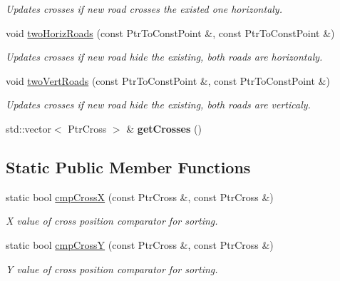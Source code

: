 \begin{DoxyCompactItemize}
\begin{DoxyCompactList}\small\item\em Updates crosses if new road crosses the existed one horizontaly. \end{DoxyCompactList}\item 
void \hyperlink{classCrossFactory_aabc61b3a89fc71f7758780135c599e97}{two\-Horiz\-Roads} (const Ptr\-To\-Const\-Point \&, const Ptr\-To\-Const\-Point \&)
\begin{DoxyCompactList}\small\item\em Updates crosses if new road hide the existing, both roads are horizontaly. \end{DoxyCompactList}\item 
void \hyperlink{classCrossFactory_ac699978962ee263fb01c189891cb4a9b}{two\-Vert\-Roads} (const Ptr\-To\-Const\-Point \&, const Ptr\-To\-Const\-Point \&)
\begin{DoxyCompactList}\small\item\em Updates crosses if new road hide the existing, both roads are verticaly. \end{DoxyCompactList}\item 
\hypertarget{classCrossFactory_ae413173adae2b63cb79c6ac13aaa99d5}{std\-::vector$<$ Ptr\-Cross $>$ \& {\bfseries get\-Crosses} ()}\label{classCrossFactory_ae413173adae2b63cb79c6ac13aaa99d5}

\end{DoxyCompactItemize}
\subsection*{Static Public Member Functions}
\begin{DoxyCompactItemize}
\item 
static bool \hyperlink{classCrossFactory_a38f0b619437d1d866da32739aecb85eb}{cmp\-Cross\-X} (const Ptr\-Cross \&, const Ptr\-Cross \&)
\begin{DoxyCompactList}\small\item\em X value of cross position comparator for sorting. \end{DoxyCompactList}\item 
static bool \hyperlink{classCrossFactory_ac3f69512a614ed1f57c7595bd21f10c1}{cmp\-Cross\-Y} (const Ptr\-Cross \&, const Ptr\-Cross \&)
\begin{DoxyCompactList}\small\item\em Y value of cross position comparator for sorting. \end{DoxyCompactList}\end{DoxyCompactItemize}


